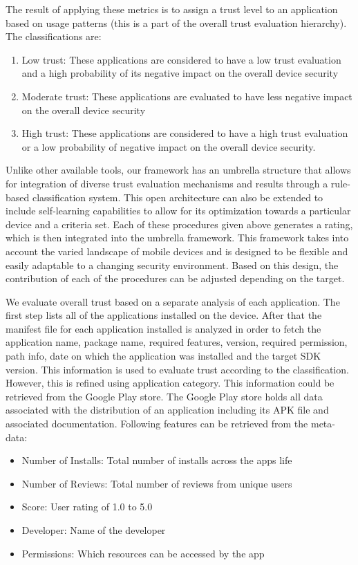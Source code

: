 The result of applying these metrics is to assign a trust level to an application based on usage patterns (this is a part of the
overall trust evaluation hierarchy).
The classifications are: 
\begin{enumerate}
  \item Low trust: These applications are considered to have
a low trust evaluation and a high probability of its negative
impact on the overall device security
  \item Moderate trust: These applications are evaluated to have
less negative  impact on the overall device security
  \item High trust: These applications are considered to have a high
trust evaluation or a low probability of  negative impact
on the overall device security.
\end{enumerate}


Unlike other available tools, our framework has an umbrella structure that allows for integration of 
diverse trust evaluation mechanisms and results through a rule-based classification system.
This open architecture can also be extended to include 
 self-learning capabilities to allow for its optimization towards a particular device and a criteria set. Each of these procedures given above generates a rating, which is then integrated into the umbrella framework. This framework takes into account the varied landscape of mobile devices and is designed to be flexible and easily adaptable to a changing security environment. 
Based on this design, the contribution of each of the procedures can be adjusted depending on the target.


We evaluate overall trust based on a separate
analysis of each application. The first step lists all of the
applications installed on the device. After that the
manifest file for each application installed is analyzed in order to
fetch the application name, package name, required features,
version, required permission, path info, date on which the
application was installed and the target SDK version. This
information is used to evaluate  trust according to the classification.
However, this is refined using
application category. This information could
be retrieved from the Google Play store. The Google Play store
holds all data associated with the distribution of an application
including its APK file and associated documentation.  Following
features can be retrieved from the
meta-data:
\begin{itemize}
  \item Number of Installs: Total number of installs across the apps life
  \item Number of Reviews: Total number of reviews from unique users
  \item Score: User rating of 1.0 to 5.0
  \item Developer: Name of the developer
  \item Permissions: Which resources can be accessed by the app
\end{itemize}

